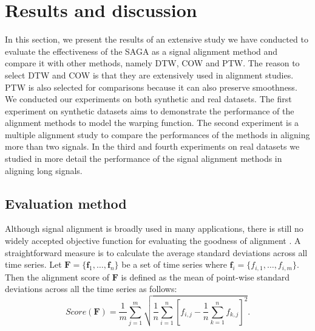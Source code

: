 \documentclass[number,1p,12pt]{elsarticle}
\begin{document}
\section{Results and discussion}
In this section, we present the results of an extensive study we have conducted to evaluate the effectiveness of the SAGA as a signal alignment method and compare it with other methods, namely DTW, COW and PTW. The reason to select DTW and COW is that they are extensively used in alignment studies. PTW is also selected for comparisons because it can also preserve smoothness. We conducted our experiments on both synthetic and real datasets. The first experiment on synthetic datasets aims to demonstrate the performance of the alignment methods to model the warping function. The second experiment is a multiple alignment study to compare the performances of the methods in aligning more than two signals. In the third and fourth experiments on real datasets we studied in more detail the performance of the signal alignment methods in aligning long signals.

\subsection{Evaluation method}
Although signal alignment is broadly used in many applications, there is still no widely accepted objective function for evaluating the goodness of alignment \cite{Listgarten2007a}. A straightforward measure is to calculate the average standard deviations across all time series. Let $\mathbf{F}=\{\mathbf{f}_1,\ldots,\mathbf{f}_n\}$ be a set of time series where $\mathbf{f}_i = \{ f_{i,1},\ldots,f_{i,m}\}$. Then the alignment score of $\mathbf{F}$ is defined as the mean of point-wise standard deviations across all the time series as follows:
\begin{equation}
Score(\mathbf{F}) = \frac{1}{m}\sum_{j=1}^m \sqrt{\frac{1}{n}\sum_{i=1}^n \left[ f_{i,j}-\frac{1}{n}\sum_{k=1}^n  f_{k,j}\right]^2}.
\label{eq1DScore}
\end{equation}
\end{document}

